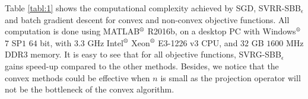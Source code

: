 \documentclass[letterpaper]{article} %
\begin{document}
%


Table \ref{tabl:1} shows the computational complexity achieved by SGD, SVRR-SBB$_\epsilon$ and batch gradient descent for convex and non-convex objective functions. All computation is done using MATLAB$^\text{\textregistered{}}$ R2016b, on a desktop PC with Windows$^\text{\textregistered{}}$ $7$ SP$1$ $64$ bit, with $3.3$ GHz Intel$^\text{\textregistered{}}$ Xeon$^\text{\textregistered{}}$ E3-1226 v3 CPU, and $32$ GB $1600$ MHz DDR3 memory. It is easy to see that for all objective functions, SVRG-SBB$_\epsilon$ gains speed-up compared to the other methods. Besides, we notice that the convex methods could be effective when $n$ is small as the projection operator will not be the bottleneck of the convex algorithm.
\end{document}
